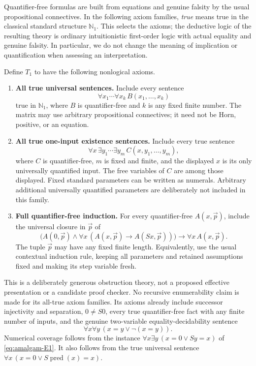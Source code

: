 Quantifier-free formulas are built from equations and genuine falsity
by the usual propositional connectives. In the following axiom
families, \emph{true} means true in the classical standard structure
$\mathbb N_1$. This selects the axioms; the deductive logic of the
resulting theory is ordinary intuitionistic first-order logic with
actual equality and genuine falsity. In particular, we do not change
the meaning of implication or quantification when assessing an
interpretation.

Define $T_1$ to have the following nonlogical axioms.
\begin{enumerate}
\item \textbf{All true universal sentences.} Include every sentence
\[
  \forall x_1\cdots\forall x_k\,B(x_1,\ldots,x_k)
  \tag{U}\label{eq:amalgam-U}
\]
true in $\mathbb N_1$, where $B$ is quantifier-free and $k$ is any
fixed finite number. The matrix may use arbitrary propositional
connectives; it need not be Horn, positive, or an equation.
\item \textbf{All true one-input existence sentences.} Include every
true sentence
\[
 \forall x\,\exists y_1\cdots\exists y_m\,
                 C(x,y_1,\ldots,y_m),
 \tag{E1}\label{eq:amalgam-E1}
\]
where $C$ is quantifier-free, $m$ is fixed and finite, and the displayed
$x$ is its only universally quantified input. The free variables of
$C$ are among those displayed. Fixed standard parameters can be
written as numerals. Arbitrary additional universally quantified
parameters are deliberately not included in this family.
\item \textbf{Full quantifier-free induction.} For every
quantifier-free $A(x,\vec p)$, include the universal closure in
$\vec p$ of
\[
 \bigl(A(0,\vec p)\wedge
       \forall x\,(A(x,\vec p)\to A(Sx,\vec p))\bigr)
       \to\forall x\,A(x,\vec p).
 \tag{QFI}\label{eq:amalgam-QFI}
\]
The tuple $\vec p$ may have any fixed finite length. Equivalently,
use the usual contextual induction rule, keeping all parameters and
retained assumptions fixed and making its step variable fresh.
\end{enumerate}

This is a deliberately generous obstruction theory, not a proposed
effective presentation or a candidate proof checker. No recursive
enumerability claim is made for its all-true axiom families.
Its axioms already include successor injectivity and separation,
$0\ne S0$, every true quantifier-free fact with any finite number
of inputs, and the genuine two-variable equality-decidability sentence
\[
                 \forall x\forall y\,(x=y\vee\neg(x=y)).
 \tag{DecEq}\label{eq:amalgam-deceq}
\]
Numerical coverage follows from the instance
$\forall x\exists y\,(x=0\vee Sy=x)$ of \eqref{eq:amalgam-E1}.
It also follows from the true universal sentence
$\forall x\,(x=0\vee S\operatorname{pred}(x)=x)$.


